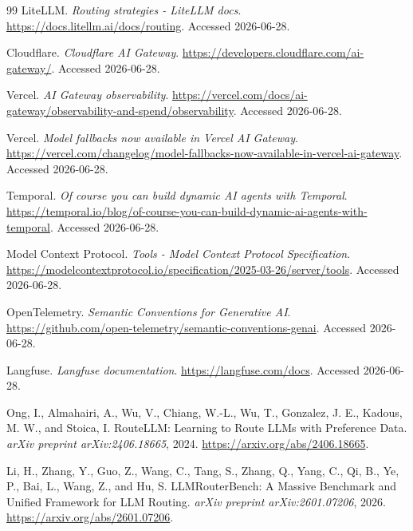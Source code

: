 \begin{thebibliography}{99}
LiteLLM.
\newblock \emph{Routing strategies - LiteLLM docs}.
\newblock \url{https://docs.litellm.ai/docs/routing}. Accessed 2026-06-28.

Cloudflare.
\newblock \emph{Cloudflare AI Gateway}.
\newblock \url{https://developers.cloudflare.com/ai-gateway/}. Accessed 2026-06-28.

Vercel.
\newblock \emph{AI Gateway observability}.
\newblock \url{https://vercel.com/docs/ai-gateway/observability-and-spend/observability}. Accessed 2026-06-28.

Vercel.
\newblock \emph{Model fallbacks now available in Vercel AI Gateway}.
\newblock \url{https://vercel.com/changelog/model-fallbacks-now-available-in-vercel-ai-gateway}. Accessed 2026-06-28.

Temporal.
\newblock \emph{Of course you can build dynamic AI agents with Temporal}.
\newblock \url{https://temporal.io/blog/of-course-you-can-build-dynamic-ai-agents-with-temporal}. Accessed 2026-06-28.

Model Context Protocol.
\newblock \emph{Tools - Model Context Protocol Specification}.
\newblock \url{https://modelcontextprotocol.io/specification/2025-03-26/server/tools}. Accessed 2026-06-28.

OpenTelemetry.
\newblock \emph{Semantic Conventions for Generative AI}.
\newblock \url{https://github.com/open-telemetry/semantic-conventions-genai}. Accessed 2026-06-28.

Langfuse.
\newblock \emph{Langfuse documentation}.
\newblock \url{https://langfuse.com/docs}. Accessed 2026-06-28.

Ong, I., Almahairi, A., Wu, V., Chiang, W.-L., Wu, T., Gonzalez, J. E., Kadous, M. W., and Stoica, I.
\newblock RouteLLM: Learning to Route LLMs with Preference Data.
\newblock \emph{arXiv preprint arXiv:2406.18665}, 2024. \url{https://arxiv.org/abs/2406.18665}.

Li, H., Zhang, Y., Guo, Z., Wang, C., Tang, S., Zhang, Q., Yang, C., Qi, B., Ye, P., Bai, L., Wang, Z., and Hu, S.
\newblock LLMRouterBench: A Massive Benchmark and Unified Framework for LLM Routing.
\newblock \emph{arXiv preprint arXiv:2601.07206}, 2026. \url{https://arxiv.org/abs/2601.07206}.

\end{thebibliography}
